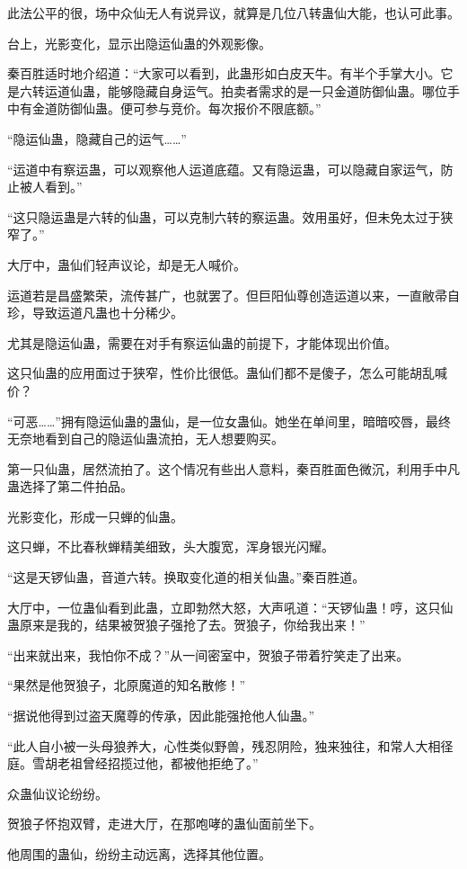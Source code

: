 \begin{this_body}
此法公平的很，场中众仙无人有说异议，就算是几位八转蛊仙大能，也认可此事。

台上，光影变化，显示出隐运仙蛊的外观影像。

秦百胜适时地介绍道：“大家可以看到，此蛊形如白皮天牛。有半个手掌大小。它是六转运道仙蛊，能够隐藏自身运气。拍卖者需求的是一只金道防御仙蛊。哪位手中有金道防御仙蛊。便可参与竞价。每次报价不限底额。”

“隐运仙蛊，隐藏自己的运气……”

“运道中有察运蛊，可以观察他人运道底蕴。又有隐运蛊，可以隐藏自家运气，防止被人看到。”

“这只隐运蛊是六转的仙蛊，可以克制六转的察运蛊。效用虽好，但未免太过于狭窄了。”

大厅中，蛊仙们轻声议论，却是无人喊价。

运道若是昌盛繁荣，流传甚广，也就罢了。但巨阳仙尊创造运道以来，一直敝帚自珍，导致运道凡蛊也十分稀少。

尤其是隐运仙蛊，需要在对手有察运仙蛊的前提下，才能体现出价值。

这只仙蛊的应用面过于狭窄，性价比很低。蛊仙们都不是傻子，怎么可能胡乱喊价？

“可恶……”拥有隐运仙蛊的蛊仙，是一位女蛊仙。她坐在单间里，暗暗咬唇，最终无奈地看到自己的隐运仙蛊流拍，无人想要购买。

第一只仙蛊，居然流拍了。这个情况有些出人意料，秦百胜面色微沉，利用手中凡蛊选择了第二件拍品。

光影变化，形成一只蝉的仙蛊。

这只蝉，不比春秋蝉精美细致，头大腹宽，浑身银光闪耀。

“这是天锣仙蛊，音道六转。换取变化道的相关仙蛊。”秦百胜道。

大厅中，一位蛊仙看到此蛊，立即勃然大怒，大声吼道：“天锣仙蛊！哼，这只仙蛊原来是我的，结果被贺狼子强抢了去。贺狼子，你给我出来！”

“出来就出来，我怕你不成？”从一间密室中，贺狼子带着狞笑走了出来。

“果然是他贺狼子，北原魔道的知名散修！”

“据说他得到过盗天魔尊的传承，因此能强抢他人仙蛊。”

“此人自小被一头母狼养大，心性类似野兽，残忍阴险，独来独往，和常人大相径庭。雪胡老祖曾经招揽过他，都被他拒绝了。”

众蛊仙议论纷纷。

贺狼子怀抱双臂，走进大厅，在那咆哮的蛊仙面前坐下。

他周围的蛊仙，纷纷主动远离，选择其他位置。


\end{this_body}
